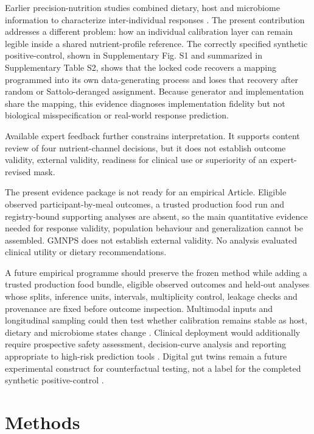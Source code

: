 Earlier precision-nutrition studies combined dietary, host and microbiome
information to characterize inter-individual responses
\cite{zeevi2015personalized,berry2020postprandial,asnicar2021microbiome}.
The present contribution addresses a different problem: how an individual
calibration layer can remain legible inside a shared nutrient-profile reference.
The correctly specified synthetic positive-control, shown in Supplementary
Fig. S1 and summarized in Supplementary Table S2, shows that the locked code
recovers a mapping programmed into its own data-generating process and loses
that recovery after random or Sattolo-deranged assignment. Because generator
and implementation share the mapping, this evidence diagnoses implementation
fidelity but not biological misspecification or real-world response prediction.

Available expert feedback further constrains interpretation. It supports
content review of four nutrient-channel decisions, but it does not establish
outcome validity, external validity, readiness for clinical use or superiority of an
expert-revised mask.

The present evidence package is not ready for an empirical Article. Eligible
observed participant-by-meal outcomes, a trusted production food run and
registry-bound supporting analyses are absent, so the main quantitative
evidence needed for response validity, population behaviour and generalization
cannot be assembled. GMNPS does not establish external validity. No analysis evaluated clinical utility or dietary recommendations.

A future empirical programme should preserve the frozen method while adding a
trusted production food bundle, eligible observed outcomes and held-out analyses
whose splits, inference units, intervals, multiplicity control, leakage checks
and provenance are fixed before outcome inspection. Multimodal inputs and
longitudinal sampling could then test whether calibration remains stable as host,
dietary and microbiome states change \cite{david2014diet,asnicar2026gut}.
Clinical deployment would additionally require prospective safety assessment,
decision-curve analysis and reporting appropriate to high-risk prediction tools
\cite{collins2015tripod,wolff2019probast,collins2024tripodAi}. Digital gut twins
remain a future experimental construct for counterfactual testing, not a label
for the completed synthetic positive-control \cite{gkouskou2020digitaltwins}.

\section*{Methods}

